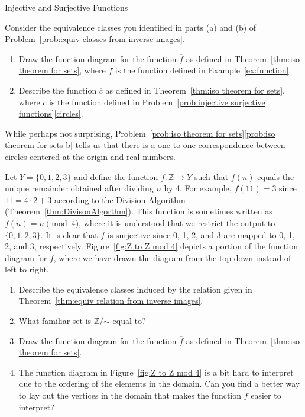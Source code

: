 \begin{section}{Injective and Surjective Functions}
\begin{problem}\label{prob:iso theorem for sets}
Consider the equivalence classes you identified in parts (a) and (b) of Problem~\ref{prob:equiv classes from inverse images}.
\begin{enumerate}[label=\textrm{(\alph*)}]
\item Draw the function diagram for the function $\overline{f}$ as defined in Theorem~\ref{thm:iso theorem for sets}, where $f$ is the function defined in Example~\ref{ex:function}.
\item\label{prob:iso theorem for sets b} Describe the function $\overline{c}$ as defined in Theorem~\ref{thm:iso theorem for sets}, where $c$ is the function defined in Problem~\ref{prob:injective surjective functions}\ref{circles}.
\end{enumerate}
\end{problem}

While perhaps not surprising, Problem~\ref{prob:iso theorem for sets}\ref{prob:iso theorem for sets b} tells us that there is a one-to-one correspondence between circles centered at the origin and real numbers.

\begin{problem}\label{prob:Z to Z mod 4}
Let $Y=\{0,1,2,3\}$ and define the function $f:\mathbb{Z}\to Y$ such that $f(n)$ equals the unique remainder obtained after dividing $n$ by 4. For example, $f(11)=3$ since $11=4\cdot 2+3$ according to the Division Algorithm (Theorem~\ref{thm:DivisonAlgorthm}). This function is sometimes written as $f(n)=n \pmod{4}$, where it is understood that we restrict the output to $\{0,1,2,3\}$. It is clear that $f$ is surjective since 0, 1, 2, and 3 are mapped to 0, 1, 2, and 3, respectively.  Figure~\ref{fig:Z to Z mod 4} depicts a portion of the function diagram for $f$, where we have drawn the diagram from the top down instead of left to right.
\begin{enumerate}[label=\textrm{(\alph*)}]
\item Describe the equivalence classes induced by the relation given in Theorem~\ref{thm:equiv relation from inverse images}.
\item What familiar set is $\mathbb{Z}/\mathord\sim$ equal to?
\item Draw the function diagram for the function $\overline{f}$ as defined in Theorem~\ref{thm:iso theorem for sets}.
\item The function diagram in Figure~\ref{fig:Z to Z mod 4} is a bit hard to interpret due to the ordering of the elements in the domain.  Can you find a better way to lay out the vertices in the domain that makes the function $f$ easier to interpret?
\end{enumerate}
\end{problem}


\end{section}
